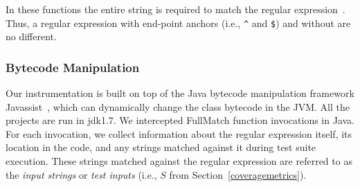 \noindent In these functions the entire string is required to match the regular expression~\cite{friedl2002mastering}. Thus, a regular expression with end-point anchors (i.e., \verb!^! and \verb!$!) and without are no different. 
 
 \subsubsection{Bytecode Manipulation}
 Our instrumentation is built on top of the Java bytecode manipulation framework Javassist~\cite{javassist}, which can dynamically change the class bytecode in the JVM. All the projects are run in jdk1.7. We intercepted FullMatch function invocations in Java. For each invocation, we collect information about the regular expression itself, its location in the code, and any strings matched against it during test suite execution. These strings matched against the regular expression are referred to as the \emph{input strings} or \emph{test inputs} (i.e., $S$ from Section~\ref{coveragemetrics}). %


